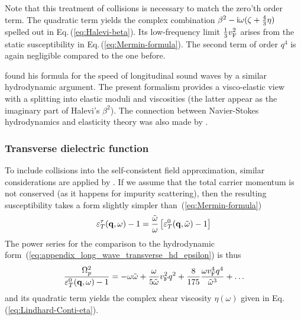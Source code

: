 \documentclass[11pt, oneside]{article}   	%
\def\OmegaP{\Omega_{p}}
\begin{document}
Note that this treatment of collisions is necessary to match the zero'th order term.
The quadratic term yields the complex combination 
${\beta}^2 - {\rm i} \omega (\zeta + \tfrac43\eta)$ spelled out in Eq.\,(\ref{eq:Halevi-beta}).
Its low-frequency limit $\tfrac13 v_{\rm F}^2$ arises from the static 
susceptibility in Eq.\,(\ref{eq:Mermin-formula}).
The second term of order $q^4$ is again negligible compared to the one before.

\citet{Halevi_1995} found his formula for the speed of longitudinal sound waves by
a similar hydrodynamic argument. The present formalism provides a visco-elastic view 
with a splitting into elastic moduli and viscosities (the latter appear as the imaginary
part of Halevi's $\beta^2$). The connection between Navier-Stokes hydrodynamics and
elasticity theory was also made by \citet{Conti_1999}.



\subsubsection{Transverse dielectric function}
\label{a:transverse-epsilon-from-Lindhard}

To include collisions into the self-consistent field approximation, similar
considerations are applied by \citet{Conti_1999}.
If we assume that the total carrier momentum is not 
conserved (as it happens for impurity scattering), then the resulting
susceptibility takes a form slightly simpler than~(\ref{eq:Mermin-formula})
\begin{equation}
\varepsilon^{\tau}_{T}( {\bf q}, \omega ) - 1 = 
\frac{\tilde{\omega}}{\omega} \left[ \varepsilon^0_{T}( {\bf q}, \tilde{\omega}) - 1 \right]
\label{eq:Kliewer-Conti-formula}
\end{equation}
The power series for the comparison to the hydrodynamic form~(\ref{eq:appendix_long_wave_transverse_hd_epsilon}) is thus
\begin{equation}
\frac{ \OmegaP^2 }{ \varepsilon^0_{T}( {\bf q}, \omega ) - 1} =
-\omega \tilde\omega + \frac{\omega}{5 \tilde\omega} v_{\rm F}^2 q^2 
+ \frac{ 8 }{ 175} \frac{\omega v_{\rm F}^4 q^4}{ \tilde\omega^3}
+ \ldots
\label{eq:inverse-transverse-susceptibility}
\end{equation}
and its quadratic term yields the complex shear viscosity $\eta(\omega)$ given in 
Eq.\,(\ref{eq:Lindhard-Conti-eta}).
\end{document}
